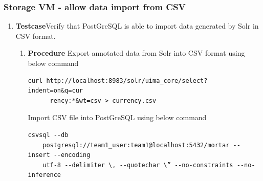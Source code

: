 \subsubsection{Storage VM - allow data import from CSV}
\begin{enumerate}
\item \textbf{Testcase}\newline Verify that PostGreSQL is
    able to import data generated by Solr in CSV format.
  \begin{enumerate}[label={}]
  \item \textbf{Procedure}\newline
    Export annotated data from Solr into CSV format using below
    command
    \begin{lstlisting}[style=Bash]
      curl http://localhost:8983/solr/uima_core/select?indent=on&q=cur
      rency:*&wt=csv > currency.csv
    \end{lstlisting}
    Import CSV file into PostGreSQL using below command
    \begin{lstlisting}[style=Bash]
    csvsql --db
    postgresql://team1_user:team1@localhost:5432/mortar --insert --encoding
    utf-8 --delimiter \, --quotechar \” --no-constraints --no-inference
    \end{lstlisting}


\end{enumerate}
\end{enumerate}
